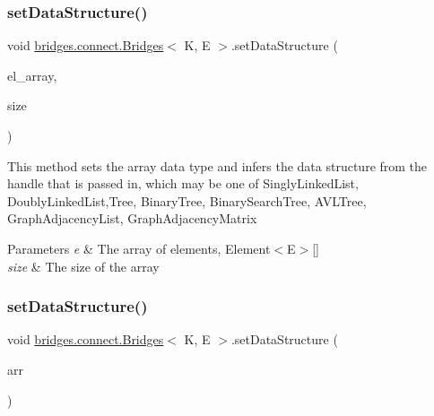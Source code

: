 \subsubsection{\texorpdfstring{set\+Data\+Structure()}{setDataStructure()}\hspace{0.1cm}{\footnotesize\ttfamily [1/12]}}
{\footnotesize\ttfamily void \hyperlink{classbridges_1_1connect_1_1_bridges}{bridges.\+connect.\+Bridges}$<$ K, E $>$.set\+Data\+Structure (\begin{DoxyParamCaption}\item[{\hyperlink{classbridges_1_1base_1_1_element}{Element}$<$ E $>$ \mbox{[}$\,$\mbox{]}}]{el\+\_\+array,  }\item[{int}]{size }\end{DoxyParamCaption})}

This method sets the array data type and infers the data structure from the handle that is passed in, which may be one of Singly\+Linked\+List, Doubly\+Linked\+List,Tree, Binary\+Tree, Binary\+Search\+Tree, A\+V\+L\+Tree, Graph\+Adjacency\+List, Graph\+Adjacency\+Matrix


\begin{DoxyParams}{Parameters}
{\em e} & The array of elements, Element$<$\+E$>$\mbox{[}\mbox{]} \\
\hline
{\em size} & The size of the array \\
\hline
\end{DoxyParams}
\hypertarget{classbridges_1_1connect_1_1_bridges_a2cd9af150b77b8337327ea67544a0e8f}{}\label{classbridges_1_1connect_1_1_bridges_a2cd9af150b77b8337327ea67544a0e8f} 
\subsubsection{\texorpdfstring{set\+Data\+Structure()}{setDataStructure()}\hspace{0.1cm}{\footnotesize\ttfamily [2/12]}}
{\footnotesize\ttfamily void \hyperlink{classbridges_1_1connect_1_1_bridges}{bridges.\+connect.\+Bridges}$<$ K, E $>$.set\+Data\+Structure (\begin{DoxyParamCaption}\item[{\hyperlink{classbridges_1_1base_1_1_array}{Array}$<$ E $>$}]{arr }\end{DoxyParamCaption})}

